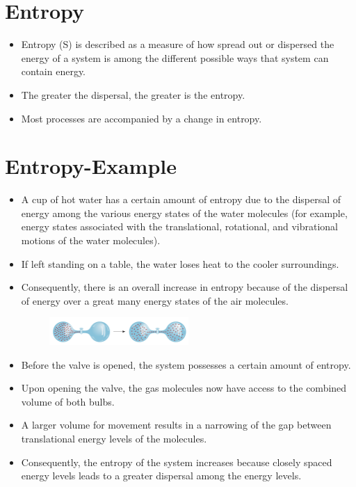 \documentclass[a4paper,12pt,twocolumn]{article}
\begin{document}
\section{Entropy}
\begin{itemize}
\item Entropy (S) is described as a measure of how spread out or dispersed the energy of a system is among the different possible ways that system can contain energy. 
\item The greater the dispersal, the greater is the entropy.
\item Most processes are accompanied by a change in entropy.
\end{itemize}
\section{Entropy-Example}
\begin{itemize}

\item A cup of hot water has a certain amount of entropy due to the dispersal of energy among the various energy states of the water molecules (for example, energy states associated with the translational, rotational, and vibrational motions of the water molecules). 
\item If left standing on a table, the water loses heat to the cooler surroundings. 
\item Consequently, there is an overall increase in entropy because of the dispersal of energy over a great many energy states of the air molecules.
\begin{figure}[h]
\centering
\includegraphics[width=0.5\textwidth]{Screenshot 2023-03-27 004722.png}
\end{figure}
\item Before the valve is opened, the system possesses a certain amount of entropy. 
\item Upon opening the valve, the gas molecules now have access to the combined volume of both bulbs. 
\item A larger volume for movement results in a narrowing of the gap between translational energy levels of the molecules. 
\item Consequently, the entropy of the system increases because closely spaced energy levels leads to a greater dispersal among the energy levels.
\end{itemize}
\end{document}
